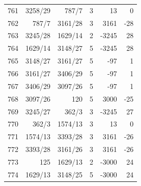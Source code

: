 \documentclass[11pt,a4paper]{article}
\begin{document}
\begin{minipage}[t]{.49\linewidth}
\begin{tabular*}{\linewidth}{@{}r@{\extracolsep{\fill}}rrrrr@{}}
761 & 3258/29 & 787/7 & 3 & 13 & 0\\
762 & 787/7 & 3161/28 & 3 & 3161 & -28\\
763 & 3245/28 & 1629/14 & 2 & -3245 & 28\\
764 & 1629/14 & 3148/27 & 5 & -3245 & 28\\
765 & 3148/27 & 3161/27 & 5 & -97 & 1\\
766 & 3161/27 & 3406/29 & 5 & -97 & 1\\
767 & 3406/29 & 3097/26 & 5 & -97 & 1\\
768 & 3097/26 & 120 & 5 & 3000 & -25\\
769 & 3245/27 & 362/3 & 3 & -3245 & 27\\
770 & 362/3 & 1574/13 & 3 & 13 & 0\\
771 & 1574/13 & 3393/28 & 3 & 3161 & -26\\
772 & 3393/28 & 3161/26 & 3 & 3161 & -26\\
773 & 125 & 1629/13 & 2 & -3000 & 24\\
774 & 1629/13 & 3148/25 & 5 & -3000 & 24\\
\bottomrule\end{tabular*}\end{minipage}\par
\clearpage
{}\par\vspace{4pt}
\end{document}
